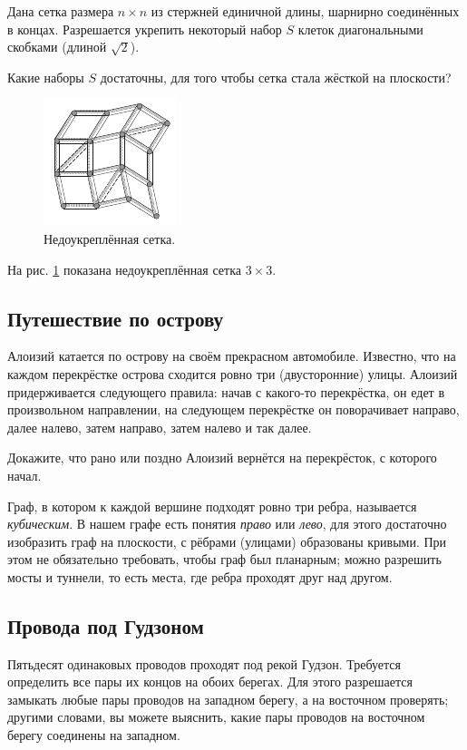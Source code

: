 Дана сетка размера $n \times n$ из стержней единичной длины, шарнирно соединённых в концах.
Разрешается укрепить некоторый набор $S$ клеток диагональными скобками (длиной $\sqrt{2}$).

Какие наборы $S$ достаточны, для того чтобы сетка стала жёсткой на плоскости?

\begin{figure}[ht!]
\centering
\includegraphics[scale=1]{pics/lattice1}
\caption{Недоукреплённая сетка.}
\label{pic:lattice1}
\end{figure}

На рис. \ref{pic:lattice1} показана недоукреплённая сетка $3 \times 3$.

\subsection*{Путешествие по острову}

Алоизий катается по острову на своём прекрасном автомобиле.
Известно, что на каждом перекрёстке острова сходится ровно три (двусторонние) улицы.
Алоизий придерживается следующего правила:
начав с какого-то перекрёстка, он едет в произвольном направлении, на следующем перекрёстке он поворачивает направо, далее налево, затем направо, затем налево и так далее.

Докажите, что рано или поздно Алоизий вернётся на перекрёсток, с которого начал.

Граф, в котором к каждой вершине подходят ровно три ребра, называется \emph{кубическим}.
В нашем графе есть понятия \emph{право} или \emph{лево},
для этого достаточно изобразить граф на плоскости, с рёбрами (улицами) образованы кривыми.
При этом не обязательно требовать, чтобы граф был планарным;
можно разрешить мосты и туннели, то есть места, где ребра проходят друг над другом.

\subsection*{Провода под Гудзоном}

Пятьдесят одинаковых проводов проходят под рекой Гудзон.
Требуется определить все пары их концов на обоих берегах.
Для этого разрешается замыкать любые пары проводов на западном берегу, а на восточном проверять;
другими словами, вы можете выяснить, какие пары проводов на восточном берегу соединены на западном.

